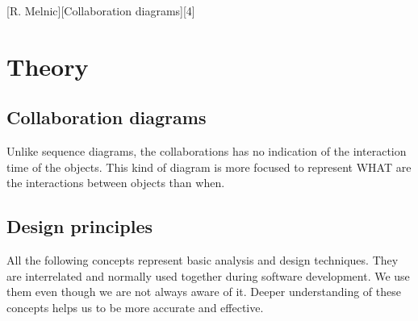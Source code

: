 \documentclass{article}
\begin{document}
	[R. Melnic][Collaboration diagrams][4]

	\section{Theory}
		\subsection{Collaboration diagrams}
			Unlike sequence diagrams, the collaborations has no indication of the interaction time of the objects. This kind of diagram is more focused to represent WHAT are the interactions between objects than when.

		\subsection{Design principles}
			All the following concepts represent basic analysis and design techniques. They are interrelated and normally used together during software development. We use them even though we are not always aware of it. Deeper understanding of these concepts helps us to be more accurate and effective.
\end{document}
